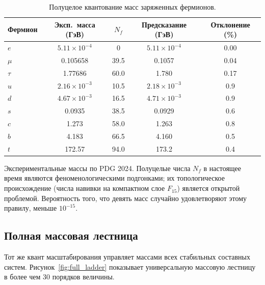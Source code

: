 \documentclass[12pt,a4paper]{article}
\theoremstyle{remark}
\begin{document}
	\begin{table}[htbp]
		\centering
		\caption{Полуцелое квантование масс заряженных фермионов.}
		\label{tab:fermions}
		\small
		\begin{tabular}{l c c c c}
			\toprule
			Фермион & Эксп.\ масса (ГэВ) & \(N_f\) & Предсказание (ГэВ) & Отклонение (\%) \\
			\midrule
			\(e\)   & \(5.11\times10^{-4}\) & 0      & \(5.11\times10^{-4}\) & 0.00 \\
			\(\mu\)  & 0.105658             & 39.5   & 0.1057               & 0.04 \\
			\(\tau\) & 1.77686              & 60.0   & 1.780                & 0.17 \\
			\(u\)   & \(2.16\times10^{-3}\) & 10.5   & \(2.18\times10^{-3}\) & 0.9 \\
			\(d\)   & \(4.67\times10^{-3}\) & 16.5   & \(4.71\times10^{-3}\) & 0.9 \\
			\(s\)   & 0.0935               & 38.5   & 0.0929               & 0.6 \\
			\(c\)   & 1.273                & 58.0   & 1.263                & 0.8 \\
			\(b\)   & 4.183                & 66.5   & 4.160                & 0.5 \\
			\(t\)   & 172.57               & 94.0   & 173.2                & 0.4 \\
			\bottomrule
		\end{tabular}
		\par\smallskip
		\footnotesize
		Экспериментальные массы по PDG 2024. Полуцелые числа \(N_f\) в настоящее время являются феноменологическими подгонками; их топологическое происхождение (числа навивки на компактном слое \(F_{15}\)) является открытой проблемой. Вероятность того, что девять масс случайно удовлетворяют этому правилу, меньше \(10^{-15}\).
	\end{table}
	
	\subsection{Полная массовая лестница}
	
	Тот же квант масштабирования управляет массами всех стабильных составных систем. Рисунок~\ref{fig:full_ladder} показывает универсальную массовую лестницу в более чем 30 порядков величины.
	
\end{document}
